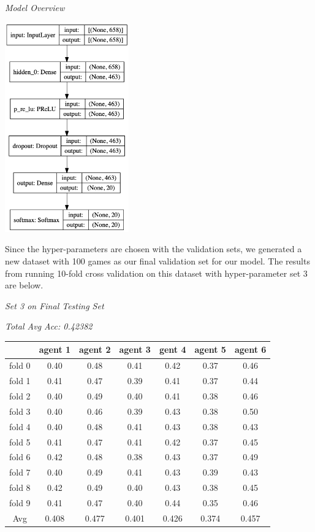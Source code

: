 \documentclass[10pt]{article}
\begin{document}
  \newpage
  \begin{center}
    \textit{Model Overview}

    \includegraphics[width=0.4\textwidth]{best_model.png}
  \end{center}

  \quad Since the hyper-parameters are chosen with the validation sets, we generated a new dataset with 100 games as our final validation set for our model. The results from running 10-fold cross validation on this dataset with hyper-parameter set 3 are below.

  \begin{center}
    \textit{Set 3 on Final Testing Set}

    \textit{Total Avg Acc: 0.42382}
    \footnotesize
    \begin{tabular}{| c | c | c | c | c | c | c |}
      \hline
       & agent 1 & agent 2 & agent 3 & gent 4 & agent 5 & agent 6 \\
      \hline
      fold 0 & 0.40 & 0.48 & 0.41 & 0.42 & 0.37 & 0.46 \\
      fold 1 & 0.41 & 0.47 & 0.39 & 0.41 & 0.37 & 0.44 \\
      fold 2 & 0.40 & 0.49 & 0.40 & 0.41 & 0.38 & 0.46 \\
      fold 3 & 0.40 & 0.46 & 0.39 & 0.43 & 0.38 & 0.50 \\
      fold 4 & 0.40 & 0.48 & 0.41 & 0.43 & 0.38 & 0.43 \\
      fold 5 & 0.41 & 0.47 & 0.41 & 0.42 & 0.37 & 0.45 \\
      fold 6 & 0.42 & 0.48 & 0.38 & 0.43 & 0.37 & 0.49 \\
      fold 7 & 0.40 & 0.49 & 0.41 & 0.43 & 0.39 & 0.43 \\
      fold 8 & 0.42 & 0.49 & 0.40 & 0.43 & 0.38 & 0.45 \\
      fold 9 & 0.41 & 0.47 & 0.40 & 0.44 & 0.35 & 0.46 \\
      Avg & 0.408 & 0.477 & 0.401 & 0.426 & 0.374 & 0.457 \\
      \hline
    \end{tabular}
    \normalsize
  \end{center}
\end{document}
